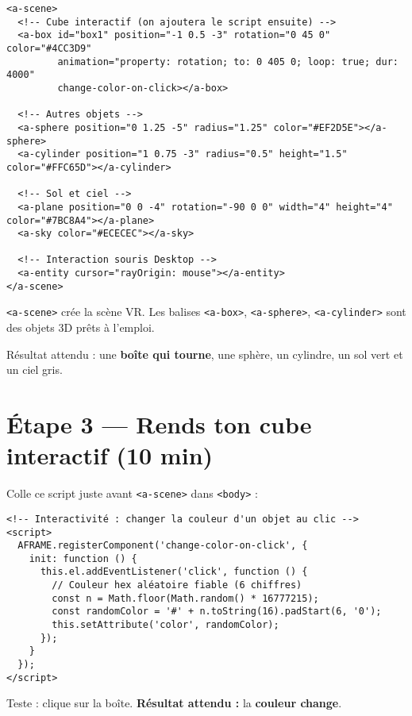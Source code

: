 \documentclass[12pt]{article}
\begin{document}
\begin{verbatim}
<a-scene>
  <!-- Cube interactif (on ajoutera le script ensuite) -->
  <a-box id="box1" position="-1 0.5 -3" rotation="0 45 0" color="#4CC3D9"
         animation="property: rotation; to: 0 405 0; loop: true; dur: 4000"
         change-color-on-click></a-box>

  <!-- Autres objets -->
  <a-sphere position="0 1.25 -5" radius="1.25" color="#EF2D5E"></a-sphere>
  <a-cylinder position="1 0.75 -3" radius="0.5" height="1.5" color="#FFC65D"></a-cylinder>

  <!-- Sol et ciel -->
  <a-plane position="0 0 -4" rotation="-90 0 0" width="4" height="4" color="#7BC8A4"></a-plane>
  <a-sky color="#ECECEC"></a-sky>

  <!-- Interaction souris Desktop -->
  <a-entity cursor="rayOrigin: mouse"></a-entity>
</a-scene>
\end{verbatim}

\begin{tip}
\texttt{<a-scene>} crée la scène VR. Les balises \texttt{<a-box>}, \texttt{<a-sphere>}, \texttt{<a-cylinder>} sont des objets 3D prêts à l'emploi.
\end{tip}

\begin{checkpoint}
Résultat attendu : une \textbf{boîte qui tourne}, une sphère, un cylindre, un sol vert et un ciel gris.
\end{checkpoint}

\section{Étape 3 — Rends ton cube interactif (10 min)}
Colle ce script juste avant \texttt{<a-scene>} dans \texttt{<body>} :

\begin{verbatim}
<!-- Interactivité : changer la couleur d'un objet au clic -->
<script>
  AFRAME.registerComponent('change-color-on-click', {
    init: function () {
      this.el.addEventListener('click', function () {
        // Couleur hex aléatoire fiable (6 chiffres)
        const n = Math.floor(Math.random() * 16777215);
        const randomColor = '#' + n.toString(16).padStart(6, '0');
        this.setAttribute('color', randomColor);
      });
    }
  });
</script>
\end{verbatim}

\begin{checkpoint}
Teste : clique sur la boîte. \textbf{Résultat attendu :} la \textbf{couleur change}.
\end{checkpoint}
\end{document}
